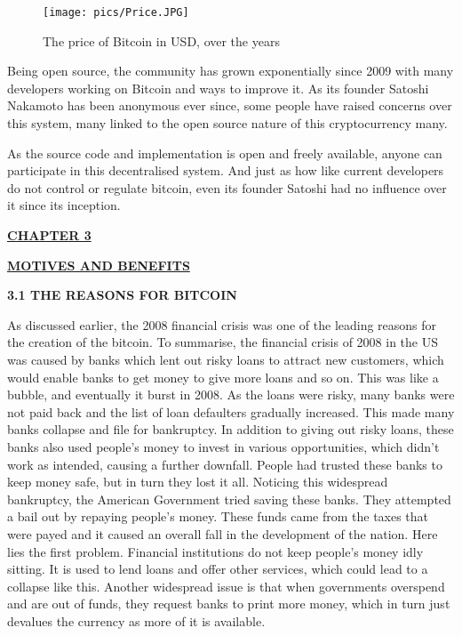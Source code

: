 \documentclass[12pt,a4paper]{report}
\begin{document}
\begin{flushleft}
\begin{figure}[h]
\centering
\caption{The price of Bitcoin in USD, over the years}
\texttt{[image: pics/Price.JPG]}
\end{figure}

\vspace{10mm}
Being open source, the community has grown exponentially since 2009 with many developers working on Bitcoin and ways to improve it. As its founder Satoshi Nakamoto has been anonymous ever since, some people have raised concerns over this system, many linked to the open source nature of this cryptocurrency many.

As the source code and implementation is open and freely available, anyone can participate in this decentralised system. And just as how like current developers do not control or regulate bitcoin, even its founder Satoshi had no influence over it since its inception.

\newpage
 
\begin{center}\underline{  \Large\textbf{CHAPTER 3}}\end{center}
\begin{center}\underline{ \Large \textbf{MOTIVES AND BENEFITS}}\end{center}

\vspace{10mm}
\textbf{3.1 THE REASONS FOR BITCOIN}
\vspace{10mm}

As discussed earlier, the 2008 financial crisis was one of the leading reasons for the creation of the bitcoin. 
To summarise, the financial crisis of 2008 in the US was caused by banks which lent out risky loans to attract new customers, which would enable banks to get money to give more loans and so on. This was like a bubble, and eventually it burst in 2008. As the loans were risky, many banks were not paid back and the list of loan defaulters gradually increased. This made many banks collapse and file for bankruptcy. In addition to giving out risky loans, these banks also used people’s money to invest in various opportunities, which didn't work as intended, causing a further downfall.
\vspace{10mm}
People had trusted these banks to keep money safe, but in turn they lost it all. Noticing this widespread bankruptcy, the American Government tried saving these banks. They attempted a bail out by repaying people's money. These funds came from the taxes that were payed and it caused an overall fall in the development of the nation.
Here lies the first problem. Financial institutions do not keep people's money idly sitting. It is used to lend loans and offer other services, which could lead to a collapse like this.
Another widespread issue is that when governments overspend and are out of funds, they request banks to print more money, which in turn just devalues the currency as more of it is available.
\vspace{10mm}


\end{flushleft}
\end{document}
